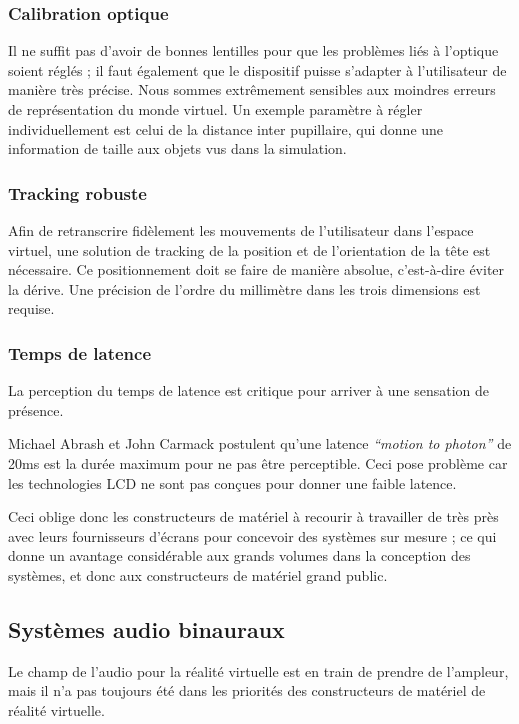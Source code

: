 \documentclass[a4,12pt]{scrartcl}
\begin{document}
\subsubsection{Calibration optique}

Il ne suffit pas d’avoir de bonnes lentilles pour que les problèmes liés à l’optique soient réglés ; il faut également que le dispositif puisse s’adapter à l’utilisateur de manière très précise. Nous sommes extrêmement sensibles aux moindres erreurs de représentation du monde virtuel. Un exemple paramètre à régler individuellement est celui de la distance inter pupillaire, qui donne une information de taille aux objets vus dans la simulation.

\subsubsection{Tracking robuste}

Afin de retranscrire fidèlement les mouvements de l’utilisateur dans l’espace virtuel, une solution de tracking de la position et de l’orientation de la tête est nécessaire. Ce positionnement doit se faire de manière absolue, c’est-à-dire éviter la dérive. Une précision de l’ordre du millimètre dans les trois dimensions est requise.

\subsubsection{Temps de latence}

La perception du temps de latence est critique pour arriver à une sensation de présence.

Michael Abrash \cite{Abrash12} et John Carmack \cite{Carmack13} postulent qu’une latence \emph{“motion to photon”} de 20ms est la durée maximum pour ne pas être perceptible. Ceci pose problème car les technologies LCD ne sont pas conçues pour donner une faible latence.

Ceci oblige donc les constructeurs de matériel à recourir à travailler de très près avec leurs fournisseurs d'écrans pour concevoir des systèmes sur mesure ; ce qui donne un avantage considérable aux grands volumes dans la conception des systèmes, et donc aux constructeurs de matériel grand public.


\subsection{Systèmes audio binauraux}

Le champ de l’audio pour la réalité virtuelle est en train de prendre de l’ampleur, mais il n’a pas toujours été dans les priorités des constructeurs de matériel de réalité virtuelle.
\end{document}
